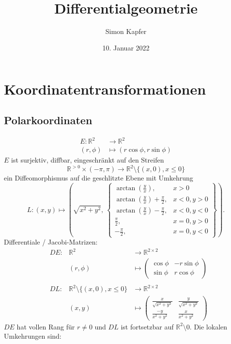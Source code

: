 \documentclass[12pt]{article}
\title{Differentialgeometrie}
\author{Simon Kapfer}
\date{10. Januar 2022}
\newcommand*{\R}{\ensuremath{\mathbb{R}}}
\begin{document}
\maketitle
\section{Koordinatentransformationen}
\subsection{Polarkoordinaten}
\begin{align*}
E: \R^2 &\longrightarrow \R^2\\
(r,\phi) &\longmapsto (r\cos\phi, r\sin\phi)
\end{align*}
$E$ ist surjektiv, diffbar, eingeschr\"ankt auf den Streifen
$$
\R^{>0}\times (-\pi,\pi) \longrightarrow \R^2 \setminus \{(x,0), x \leq 0\} 
$$
ein Diffeomorphismus auf die geschlitzte Ebene mit Umkehrung 
$$
L : (x,y) \longmapsto \left(\sqrt{x^2+y^2},\ \left\{
\begin{array}{cl}
\arctan(\frac{y}{x}), & x>0\\
\arctan(\frac{y}{x})+ \frac{\pi}{2}, & x<0, y>0\\
\arctan(\frac{y}{x})-\frac{\pi}{2}, & x<0, y<0\\
\frac{\pi}{2} , & x=0, y>0\\
-\frac{\pi}{2} , & x=0, y<0
\end{array}
\right\}\right).
$$
Differentiale / Jacobi-Matrizen:
\begin{align*}
& DE: & \R^2 &\longrightarrow \R^{2\times 2}\\
& & (r,\phi) &\longmapsto \left(
\begin{array}{cc}
\cos\phi & -r\sin\phi\\
\sin\phi & r \cos\phi
\end{array}
\right)\\\\
& DL: & \R^2 \setminus \{(x,0), x \leq 0\}  &\longrightarrow \R^{2\times 2}\\ 
& & (x,y) &\longmapsto\left(
\begin{array}{cc}
\frac{x}{\sqrt{x^2+y^2}} & \frac{y}{\sqrt{x^2+y^2}}\\
\frac{-y}{x^2+y^2} & \frac{x}{x^2+y^2}
\end{array}
\right)
\end{align*}
$DE$ hat vollen Rang f\"ur $r\neq 0$ und $DL$ ist fortsetzbar auf $\R^2\setminus 0$.
Die lokalen Umkehrungen sind:
\end{document}
